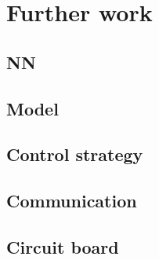 \chapter{Further work}


\section{NN}
\section{Model}
\section{Control strategy}
\section{Communication}
\section{Circuit board}
